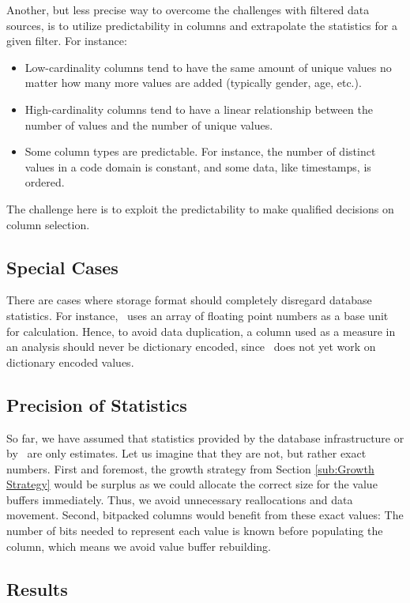 Another, but less precise way to overcome the challenges with filtered data sources, is to utilize predictability in columns and extrapolate the statistics for a given filter. For instance:
\begin{itemize}
    \item Low-cardinality columns tend to have the same amount of unique values no matter how many more values are added (typically gender, age, etc.).
    \item High-cardinality columns tend to have a linear relationship between the number of values and the number of unique values.
    \item Some column types are predictable. For instance, the number of distinct values in a code domain is constant, and some data, like timestamps, is ordered.
\end{itemize}
The challenge here is to exploit the predictability to make qualified decisions on column selection.

\subsection{Special Cases}
\label{sub:Special Cases}

There are cases where storage format should completely disregard database statistics. For instance, \gd~uses an array of floating point numbers as a base unit for calculation. Hence, to avoid data duplication, a column used as a measure in an analysis should never be dictionary encoded, since \gd~does not yet work on dictionary encoded values.

\subsection{Precision of Statistics}
So far, we have assumed that statistics provided by the database infrastructure or by \gap~are only estimates. Let us imagine that they are not, but rather exact numbers. First and foremost, the growth strategy from Section \ref{sub:Growth Strategy} would be surplus as we could allocate the correct size for the value buffers immediately. Thus, we avoid unnecessary reallocations and data movement. Second, bitpacked columns would benefit from these exact values: The number of bits needed to represent each value is known before populating the column, which means we avoid value buffer rebuilding.


\subsection{Results}
\label{sub:Results}

